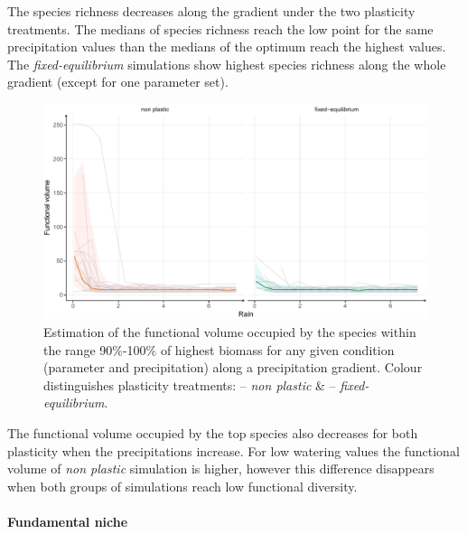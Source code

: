 The species richness decreases along the gradient under the two plasticity treatments. The medians of species richness reach the low point for the same precipitation values than the medians of the optimum reach the highest values. The \textit{fixed-equilibrium} simulations show highest species richness along the whole gradient (except for one parameter set).

\begin{figure}\label{fig:functional_div_grad}
\includegraphics[width = \textwidth]{./2_PP/Figures/Rain/gradient_plot_fdiv10.pdf}
\caption[Functional diversity of the best performing species along a precipitation gradient]{Estimation of the functional volume occupied by the species within the range 90\%-100\% of highest biomass for any given condition (parameter and precipitation) along a precipitation gradient.  Colour distinguishes plasticity treatments: \textcolor{myOrange}{-- \textit{non plastic}} \&  \textcolor{myGreen}{-- \textit{fixed-equilibrium}}.} \end{figure}

The functional volume occupied by the top species also decreases for both plasticity when the precipitations increase. For low watering values the functional volume of \textit{non plastic} simulation is higher, however this difference disappears when both groups of simulations reach low functional diversity.

\paragraph{Fundamental niche}


